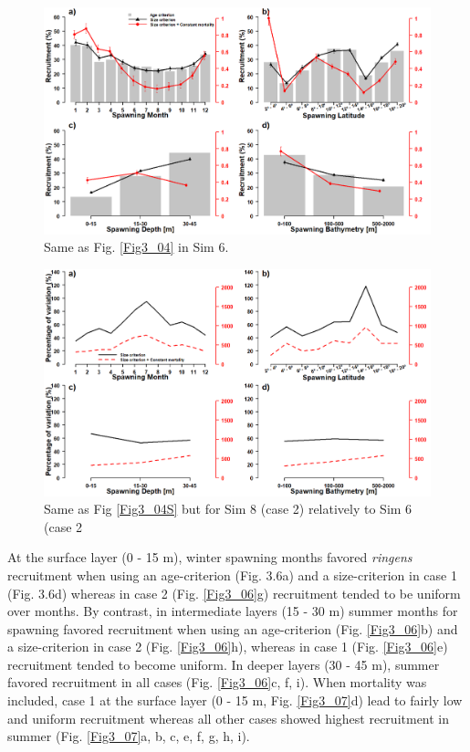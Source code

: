 \begin{figure}[ht]
	\includegraphics[width=1.0\textwidth]{figures/Fig3_05.png}
	\centering
	\caption{Same as Fig. \ref{Fig3_04} in Sim 6.}
	\label{Fig3_05}
\end{figure}

\begin{figure}[ht]
	\includegraphics[width=1.0\textwidth]{figures/Fig3_05S.png}
	\centering
	\caption{Same as Fig \ref{Fig3_04S} but for Sim 8 (case 2) relatively to Sim 6 (case 2}
	\label{Fig3_05S}
\end{figure}

At the surface layer (0 - 15 m), winter spawning months favored \textit{\gls{ringens}} recruitment when using an age-criterion (Fig. 3.6a) and a size-criterion in case 1 (Fig. 3.6d) whereas in case 2 (Fig. \ref{Fig3_06}g) recruitment tended to be uniform over months. By contrast, in intermediate layers (15 - 30 m) summer months for spawning favored recruitment when using an age-criterion (Fig. \ref{Fig3_06}b) and a size-criterion in case 2 (Fig. \ref{Fig3_06}h), whereas in case 1 (Fig. \ref{Fig3_06}e) recruitment tended to become uniform. In deeper layers (30 - 45 m), summer favored recruitment in all cases (Fig. \ref{Fig3_06}c, f, i). When mortality was included, case 1 at the surface layer (0 - 15 m, Fig. \ref{Fig3_07}d) lead to fairly low and uniform recruitment whereas all other cases showed highest recruitment in summer (Fig. \ref{Fig3_07}a, b, c, e, f, g, h, i).\\

